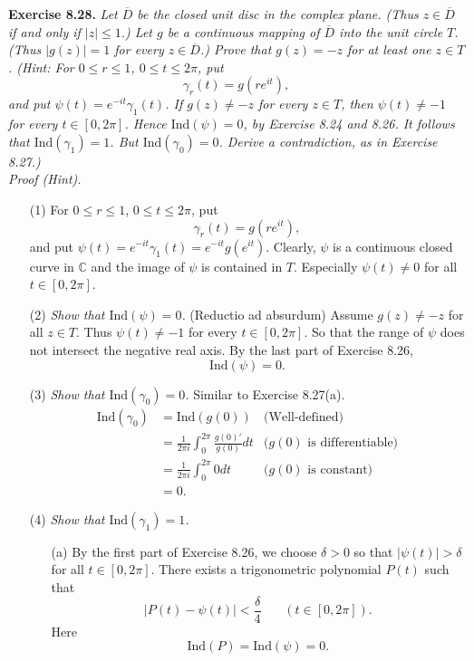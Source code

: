 \documentclass{article}
\begin{document}
\textbf{Exercise 8.28.}
\emph{Let $\overline{D}$ be the closed unit disc in the complex plane.
(Thus $z \in \overline{D}$ if and only if $|z| \leq 1$.)
Let $g$ be a continuous mapping of $\overline{D}$ into the unit circle $T$.
(Thus $|g(z)| = 1$ for every $z \in \overline{D}$.)
Prove that $g(z)=-z$ for at least one $z \in T$.
(Hint:
For $0 \leq r \leq 1$, $0 \leq t \leq 2\pi$,
put
\[
  \gamma_r(t) = g(re^{it}),
\]
and put $\psi(t) = e^{-it} \gamma_1(t)$.
If $g(z) \neq -z$ for every $z \in T$, then $\psi(t) \neq -1$ for every $t \in [0,2\pi]$.
Hence $\mathrm{Ind}(\psi) = 0$, by Exercise 8.24 and 8.26.
It follows that $\mathrm{Ind}(\gamma_1) = 1$.
But $\mathrm{Ind}(\gamma_0) = 0$.
Derive a contradiction, as in Exercise 8.27.)} \\

\emph{Proof (Hint).}
\begin{enumerate}
  \item[(1)]
  For $0 \leq r \leq 1$, $0 \leq t \leq 2\pi$,
  put
  \[
    \gamma_r(t) = g(re^{it}),
  \]
  and put $\psi(t) = e^{-it} \gamma_1(t) = e^{-it} g(e^{it})$.
  Clearly, $\psi$ is a continuous closed curve in $\mathbb{C}$
  and the image of $\psi$ is contained in $T$.
  Especially $\psi(t) \neq 0$ for all $t \in [0,2\pi]$.

  \item[(2)]
  \emph{Show that $\mathrm{Ind}(\psi) = 0$.}
  (Reductio ad absurdum)
  Assume $g(z) \neq -z$ for all $z \in T$.
  Thus $\psi(t) \neq -1$ for every $t \in [0,2\pi]$.
  So that the range of $\psi$ does not intersect the negative real axis.
  By the last part of Exercise 8.26,
  \[
    \mathrm{Ind}(\psi) = 0.
  \]

  \item[(3)]
  \emph{Show that $\mathrm{Ind}(\gamma_0) = 0$.}
  Similar to Exercise 8.27(a).
  \begin{align*}
  \mathrm{Ind}(\gamma_0)
  &= \mathrm{Ind}(g(0))
    &\text{(Well-defined)} \\
  &= \frac{1}{2\pi i}\int_{0}^{2\pi} \frac{g(0)'}{g(0)} dt
    &\text{($g(0)$ is differentiable)} \\
  &= \frac{1}{2\pi i}\int_{0}^{2\pi} 0 dt
    &\text{($g(0)$ is constant)} \\
  &= 0.
  \end{align*}

  \item[(4)]
  \emph{Show that $\mathrm{Ind}(\gamma_1) = 1$.}
  \begin{enumerate}
    \item[(a)]
    By the first part of Exercise 8.26, we choose $\delta > 0$
    so that $|\psi(t)| > \delta$ for all $t \in [0,2\pi]$.
    There exists a trigonometric polynomial $P(t)$
    such that
    \[
      |P(t) - \psi(t)| < \frac{\delta}{4}
      \:\:\:\:\:\:\:\:
      (t \in [0,2\pi]).
    \]
    Here
    \[
      \mathrm{Ind}(P) = \mathrm{Ind}(\psi) = 0.
    \]


\end{enumerate}
\end{enumerate}
\end{document}
